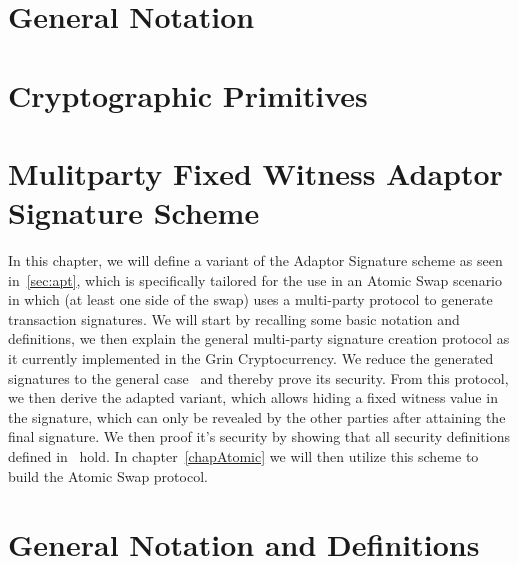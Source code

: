 \section{General Notation}\label{secGenNot}
\section{Cryptographic Primitives}\label{secCrypPrim}
\section{Mulitparty Fixed Witness Adaptor Signature Scheme} \label{sec:secscheme}

In this chapter, we will define a variant of the Adaptor Signature scheme as seen in~\ref{sec:apt},
which is specifically tailored for the use in an Atomic Swap scenario in which (at least one side of the swap) uses a multi-party protocol to generate transaction signatures.
We will start by recalling some basic notation and definitions, we then explain the general multi-party signature creation protocol as it currently implemented in the Grin Cryptocurrency.
We reduce the generated signatures to the general case~\cite{schnorr1991efficient} and thereby prove its security. From this protocol, we then derive the adapted variant, which allows hiding a fixed witness
value in the signature, which can only be revealed by the other parties after attaining the final signature.
We then proof it's security by showing that all security definitions defined in~\cite{sanches2020bitcoinchannels} hold.
In chapter~\ref{chapAtomic} we will then utilize this scheme to build the Atomic Swap protocol.

\section{General Notation and Definitions}


